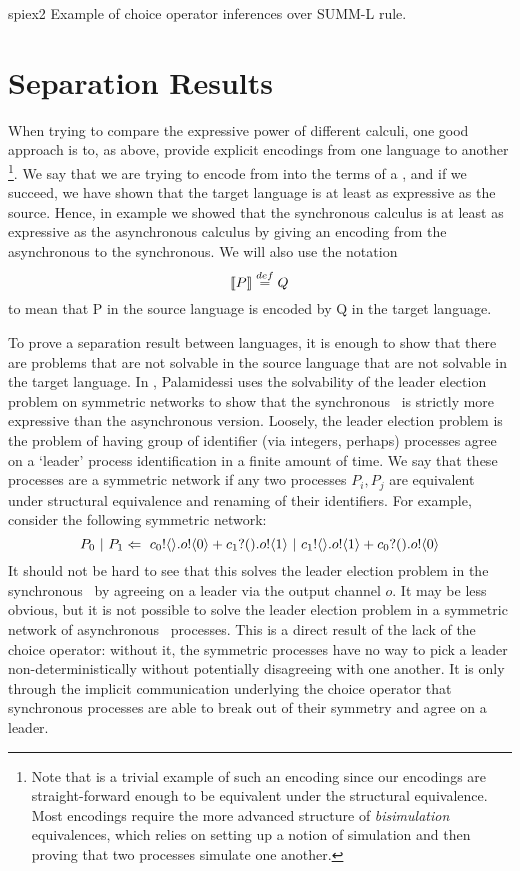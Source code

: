 \begin{example}{spiex2}
	Example of choice operator inferences over SUMM-L rule.
\end{example}

\section{Separation Results}\label{Separation Results}
When trying to compare the expressive power of different calculi, one good approach is to, as above, provide explicit encodings from one language to another
\footnote{Note that  is a trivial example of such an encoding since our encodings are straight-forward enough to be equivalent under the structural equivalence.  
Most encodings require the more advanced structure of \emph{bisimulation} equivalences, which relies on setting up a notion of simulation and then proving that two processes simulate one another.}.  
We say that we are trying to encode from  into the terms of a , and if we succeed, we have shown that the target language is at least as expressive as the source.  
Hence, in example  we showed that the synchronous calculus is at least as expressive as the asynchronous calculus by giving an encoding from the asynchronous to the synchronous.  
We will also use the notation
\[
	\llbracket{P}\rrbracket \overset{\tiny{def}}{=} Q
\]
to mean that P in the source language is encoded by Q in the target language.

To prove a separation result between languages, it is enough to show that there are problems that are not solvable in the source language that are not solvable in the target language.  
In \cite{palam03}, Palamidessi uses the solvability of the leader election problem on symmetric networks to show that the synchronous \picalc\ is strictly more expressive than the asynchronous version.  
Loosely, the leader election problem is the problem of having group of identifier (via integers, perhaps) processes agree on a `leader' process identification in a finite amount of time.  
We say that these processes are a symmetric network if any two processes $P_i, P_j$ are equivalent under structural equivalence and renaming of their identifiers.  
For example, consider the following symmetric network:
\[
	P_0\ |\  P_1 \Leftarrow\  {c_0}!\langle{}\rangle. {o}!\langle{0}\rangle + {c_1}?({}). {o}!\langle{1}\rangle \ |\  {c_1}!\langle{}\rangle. {o}!\langle{1}\rangle + {c_0}?({}). {o}!\langle{0}\rangle
\]
It should not be hard to see that this solves the leader election problem in the synchronous \picalc\ by agreeing on a leader via the output channel $o$.  
It may be less obvious, but it is not possible to solve the leader election problem in a symmetric network of asynchronous \picalc\ processes.  
This is a direct result of the lack of the choice operator: without it, the symmetric processes have no way to pick a leader non-deterministically without potentially disagreeing with one another.  
It is only through the implicit communication underlying the choice operator that synchronous processes are able to break out of their symmetry and agree on a leader.

